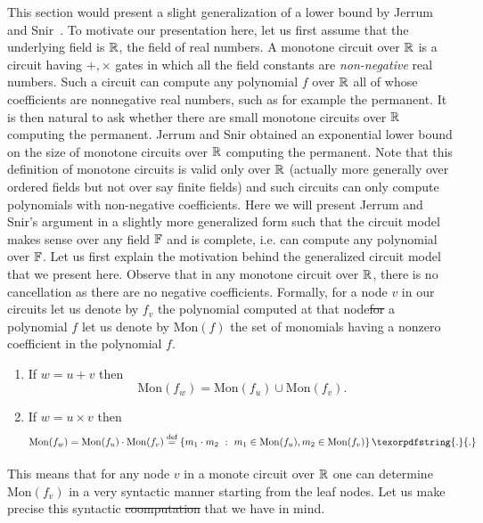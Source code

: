 \documentclass{birkjour}
\newcommand{\Mon}{\mathrm{Mon}}
\providecommand{\DIFaddtex}[1]{{\protect\color{blue}\uwave{#1}}} %
\providecommand{\DIFdeltex}[1]{{\protect\color{red}\sout{#1}}}                      %
\providecommand{\DIFaddbegin}{} %
\providecommand{\DIFaddend}{} %
\providecommand{\DIFdelbegin}{} %
\providecommand{\DIFdelend}{} %
\providecommand{\DIFadd}[1]{\texorpdfstring{\DIFaddtex{#1}}{#1}} %
\providecommand{\DIFdel}[1]{\texorpdfstring{\DIFdeltex{#1}}{}} %
\begin{document}
This section would present a slight generalization 
	of a lower bound by Jerrum and Snir~\cite{js82}. 
	To motivate our presentation here, let us first 
	assume that the underlying field is $\mathbb{R}$, the 
	field of real numbers. A monotone circuit over 
	$\mathbb{R}$ is a circuit having $+, \times$ gates in 
	which all the field constants are {\em non-negative} 
	real numbers. Such a circuit can compute any 
	polynomial $f$ over $\mathbb{R}$ all of whose 
	coefficients are nonnegative real numbers, such as 
	for example the permanent. It is then natural to ask 
	whether there are small monotone circuits over $\mathbb{R}$ 
	computing the permanent. Jerrum and Snir \cite{js82}
	obtained an exponential lower bound on the size 
	of monotone circuits over $\mathbb{R}$ computing the 
	permanent. Note that this	definition of monotone 
	circuits is valid only over $\mathbb{R}$ (actually more 
	generally over ordered fields but not over say finite 
	fields) and such circuits can only compute polynomials 
	with non-negative coefficients. Here we will present 
	Jerrum and Snir's argument in a slightly more 
	generalized form such that the circuit model makes 
	sense over any field $\mathbb{F}$ and is complete, i.e. 
	can compute any polynomial over $\mathbb{F}$. Let us first 
	explain the motivation behind the generalized circuit
	model that we present here. Observe that in any monotone 
	circuit over $\mathbb{R}$, there is no cancellation as there 
	are no negative coefficients. Formally, for a node $v$ 
	in our circuits let us denote by $f_{v}$ the polynomial 
	computed at that node\DIFdelbegin \DIFdel{for }\DIFdelend \DIFaddbegin \DIFadd{. For }\DIFaddend a polynomial $f$ let us denote 
	by $\Mon(f)$ the set of monomials having a nonzero 
	coefficient in the polynomial $f$. 
		\begin{enumerate}

			\item If $w = u + v$ then 
				$$ \Mon(f_{w}) = \Mon(f_{u}) \cup \Mon(f_{v}). $$

			\item If $w = u \times v$ then
				$$ \Mon(f_{w}) = \Mon(f_{u}) \cdot \Mon(f_{v}) \eqdef \setdef{m_1\cdot m_2}{m_1 \in \Mon(f_{u}), m_2\in \Mon(f_{v})}\DIFaddbegin \DIFadd{. }\DIFaddend $$

		\end{enumerate}
	This means that for any node $v$ in a monote circuit over 
	$\mathbb{R}$ one can determine $\Mon(f_{v})$ in a very syntactic 
	manner starting from the leaf nodes. Let us make precise 
	this syntactic \DIFdelbegin \DIFdel{coomputation }\DIFdelend \DIFaddbegin \DIFadd{computation }\DIFaddend that we have in mind.
\end{document}
